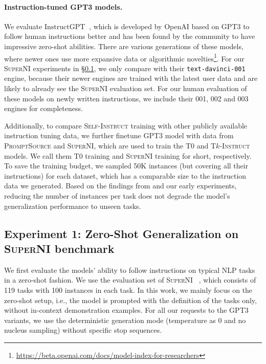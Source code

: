 \documentclass[11pt]{article}
\newcommand{\alisa}[1]{\textcolor{purple}{\textbf{[#1 -- \textsc{al}]}}}
\newcommand{\name}{\textsc{Self-Instruct}}
\newcommand{\supernat}{\textsc{Super-NaturalInstructions}}
\newcommand{\supernatShort}{\textsc{SuperNI}}
\newcommand{\tkinstruct}{\textsc{T$k$-Instruct}}
\newcommand{\tzero}{\textsc{T$0$}}
\newcommand{\gptthree}{\textsc{GPT3}}
\newcommand{\gptinstruct}[1]{$\text{InstructGPT}_{\text{#1}}$}
\newcommand{\promptsource}{\textsc{PromptSource}}
\begin{document}
\paragraph{Instruction-tuned GPT3 models.}
 We evaluate \gptinstruct{}~\cite{ouyang2022training}, 
which is developed by OpenAI based on GPT3 to follow human instructions better and has been found by the community to have impressive zero-shot abilities. 
There are various generations of these models,
where newer ones use more expansive data or algorithmic novelties\footnote{\url{https://beta.openai.com/docs/model-index-for-researchers}}.  
For our \supernatShort{} experiments in \S\ref{subsec:superni-experiments}, we only compare with their \texttt{text-davinci-001} engine, because their newer engines are trained with the latest user data and are likely to already see the \supernatShort{} evaluation set. For our human evaluation of these models on newly written instructions, we include their 001, 002 and 003 engines for completeness.

Additionally, to compare \name{} training with other publicly available instruction tuning data, we further finetune GPT3 model with data from \promptsource{} and \supernatShort{}, which are used to train the \tzero{} and \tkinstruct{} models. We call them \tzero{} training and \supernatShort{} training for short, respectively. 
To save the training budget, we sampled 50K instances (but covering all their instructions) for each dataset, which has a comparable size to the instruction data we generated. Based on the findings from \citet{wang2022benchmarking} and our early experiments, reducing the number of instances per task does not degrade the model's generalization performance to unseen tasks.



\subsection{Experiment 1: Zero-Shot Generalization on \supernatShort{} benchmark}
\label{subsec:superni-experiments}
We first evaluate the models' ability to follow instructions on typical NLP tasks in a zero-shot fashion. 
We use the evaluation set of \supernatShort{} ~\cite{wang2022benchmarking}, which consists of 119 tasks with 100 instances in each task. 
In this work, we mainly focus on the zero-shot setup, i.e., the model is prompted with the definition of the tasks only, without in-context demonstration examples.
For all our requests to the \gptthree{} variants, we use the deterministic generation mode (temperature as 0 and no nucleus sampling) without specific stop sequences.
\end{document}

